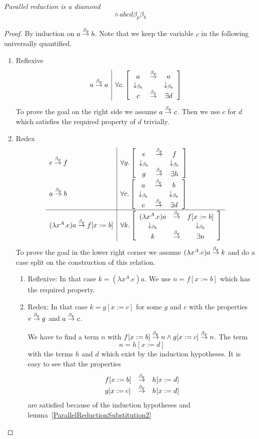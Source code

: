 \begin{theorem}
    \label{ParallelReductionDiamond}
    \emph{Parallel reduction is a diamond}
    \def\diap#1#2#3#4{\diamond {#1} {#2} {#3} {#4} {\beta_p} {\beta_b}}
    $$
    \diap a b c d
    $$

    \begin{proof} By induction on $a \stackrel{\beta_p}{\to} b$. Note that we keep the variable
        $c$ in the following universally quantified.

        \begin{enumerate}
        \item Reflexive
            $$
            \begin{array}{l|l}
                a \preduce a
                &
                \allbracket c {\diap a a c d}
            \end{array}
            $$
            To prove the goal on the right side we assume $a \stackrel{\beta_p}{\to} c$. Then
            we use $c$ for $d$ which satisfies the required property of $d$
            trivially.

        \item Redex
        $$
        \begin{array}{l|l}
            e \preduce f
            &
            \allbracket g {\diap e f g h}
            \\
            a \preduce b
            &
            \allbracket c {\diap a b c d}
            \\
            \hline
            (\lambda x^A. e) a \preduce f[x:=b]
            &
            \allbracket k {\diap {(\lambda x^A.e)a} {f[x:=b]} k n}
        \end{array}
        $$
        To prove the goal in the lower right corner we assume $(\lambda x^A.e)a
        \stackrel{\beta_p}{\to} k$ and do a case split on the construction of this relation.

            \begin{enumerate}
            \item Reflexive: In that case $k = (\lambda x^A. e) a$. We use $n =
            f[x:=b]$ which has the required property.


            \item Redex: In that case $k = g[x:=c]$ for some $g$ and $c$ with the
            properties $e \stackrel{\beta_p}{\to} g$ and $a \stackrel{\beta_p}{\to} c$.

            We have to find a term $n$ with $f[x:=b] \stackrel{\beta_p}{\to} n \land g[x:=c]
            \stackrel{\beta_p}{\to} n$. The term
            $$
                n = h[x:=d]
            $$
            with the terms $h$ and $d$ which exist by the induction hypotheses. It
            is easy to see that the properties
            $$
            \begin{array}{lll}
                f[x:=b] &\stackrel{\beta_p}{\to}& h[x:=d]
                \\
                g[x:=c] &\stackrel{\beta_p}{\to}& h[x:=d]
            \end{array}
            $$
            are satisfied because of the induction hypotheses and
            lemma~\ref{ParallelReductionSubstitution2}



\end{enumerate}
\end{enumerate}
\end{proof}
\end{theorem}
